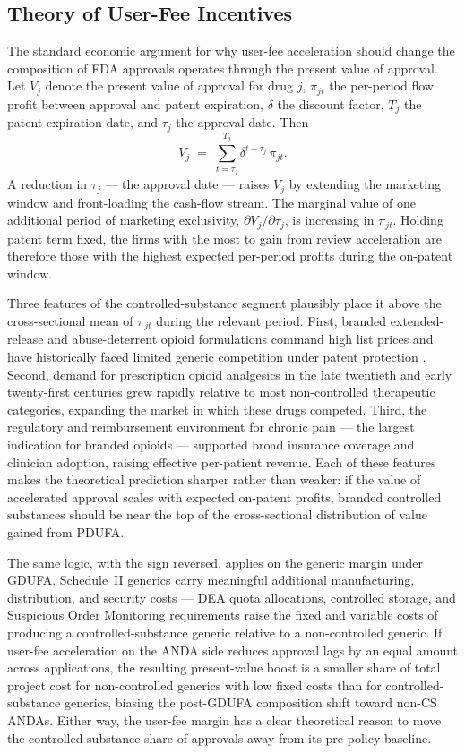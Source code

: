 \subsection{Theory of User-Fee Incentives}
\label{sec:theory}

The standard economic argument for why user-fee acceleration should change the composition of FDA approvals operates through the present value of approval. Let $V_j$ denote the present value of approval for drug $j$, $\pi_{jt}$ the per-period flow profit between approval and patent expiration, $\delta$ the discount factor, $T_j$ the patent expiration date, and $\tau_j$ the approval date. Then
\[
V_j \;=\; \sum_{t = \tau_j}^{T_j} \delta^{t - \tau_j}\,\pi_{jt}.
\]
A reduction in $\tau_j$ --- the approval date --- raises $V_j$ by extending the marketing window and front-loading the cash-flow stream. The marginal value of one additional period of marketing exclusivity, $\partial V_j / \partial \tau_j$, is increasing in $\pi_{jt}$. Holding patent term fixed, the firms with the most to gain from review acceleration are therefore those with the highest expected per-period profits during the on-patent window.

Three features of the controlled-substance segment plausibly place it above the cross-sectional mean of $\pi_{jt}$ during the relevant period. First, branded extended-release and abuse-deterrent opioid formulations command high list prices and have historically faced limited generic competition under patent protection \parencite{powellHowIncreasingMedical2020}. Second, demand for prescription opioid analgesics in the late twentieth and early twenty-first centuries grew rapidly relative to most non-controlled therapeutic categories, expanding the market in which these drugs competed. Third, the regulatory and reimbursement environment for chronic pain --- the largest indication for branded opioids --- supported broad insurance coverage and clinician adoption, raising effective per-patient revenue. Each of these features makes the theoretical prediction sharper rather than weaker: if the value of accelerated approval scales with expected on-patent profits, branded controlled substances should be near the top of the cross-sectional distribution of value gained from PDUFA.

The same logic, with the sign reversed, applies on the generic margin under GDUFA. Schedule~II generics carry meaningful additional manufacturing, distribution, and security costs --- DEA quota allocations, controlled storage, and Suspicious Order Monitoring requirements raise the fixed and variable costs of producing a controlled-substance generic relative to a non-controlled generic. If user-fee acceleration on the ANDA side reduces approval lags by an equal amount across applications, the resulting present-value boost is a smaller share of total project cost for non-controlled generics with low fixed costs than for controlled-substance generics, biasing the post-GDUFA composition shift toward non-CS ANDAs. Either way, the user-fee margin has a clear theoretical reason to move the controlled-substance share of approvals away from its pre-policy baseline.

